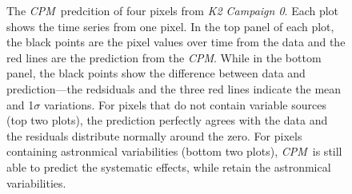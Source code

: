\documentclass[12pt, preprint]{aastex}
\newcommand{\project}[1]{\textsl{#1}}
\newcommand{\cpm}{\project{CPM}}
\newcommand{\KTCZ}{\project{K2 Campaign 0}}
\begin{document}
\begin{figure}[p]
\begin{center}
\end{center}

\caption{
  \label{lightcurves}
   The \cpm\ predcition of four pixels from \KTCZ. 
  Each plot shows the time series from one pixel.
  In the top panel of each plot, the black points are the pixel values over time from the data and the red lines are the prediction from the \cpm. 
  While in the bottom panel, the black points show the difference between data and prediction---the redsiduals and the three red lines indicate the mean and 1$\sigma$ variations.
  For pixels that do not contain variable sources (top two plots), the prediction perfectly agrees with the data and the residuals distribute normally around the zero. For pixels containing astronmical variabilities (bottom two plots), \cpm\ is still able to predict the systematic effects, while retain the astronmical variabilities.
}
\end{figure}
\end{document}
